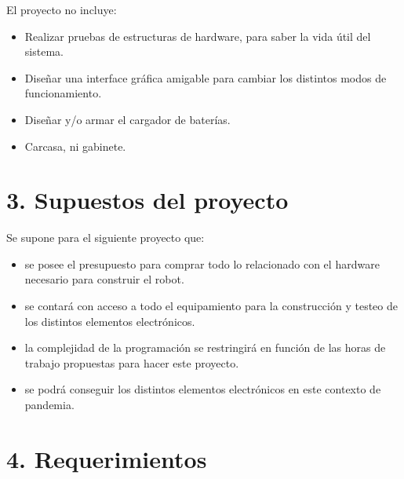 \documentclass[11pt]{charter}
\begin{document}
El proyecto no incluye:

\begin{itemize}
\item Realizar pruebas de estructuras de hardware, para saber la vida útil del sistema.
\item Diseñar una interface gráfica amigable para cambiar los distintos modos de funcionamiento.
\item Diseñar y/o armar el cargador de baterías.
\item Carcasa, ni gabinete.
\end{itemize}


\section{3. Supuestos del proyecto}
\label{sec:supuestos}


Se supone para el siguiente proyecto que:
\begin{itemize}
\item se posee el presupuesto para comprar todo lo relacionado con el hardware necesario para construir el robot. 
\item se contará con acceso a todo el equipamiento para la construcción y testeo de los distintos elementos electrónicos.
\item la complejidad de la programación se restringirá en función de las horas de trabajo propuestas para hacer este proyecto.
\item se podrá conseguir los distintos elementos electrónicos en este contexto de pandemia.
\end{itemize}


\section{4. Requerimientos}
\label{sec:requerimientos}

\end{document}
